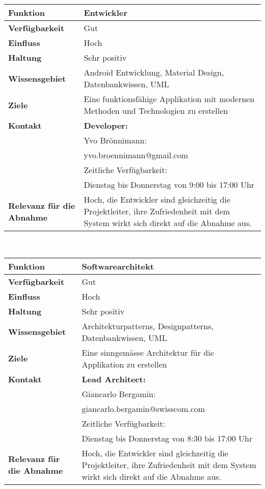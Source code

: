 \vspace{20pt}
\begin{tabular}{p{3cm}|p{9cm}}
     {\large\textbf{Funktion}} & {\large\textbf{Entwickler}}\\
     \hline
     \textbf{Verfügbarkeit} & Gut \\
     \hline
     \textbf{Einfluss} & Hoch \\
     \hline
     \textbf{Haltung}&Sehr positiv\\
     \hline
     \textbf{Wissensgebiet} & Android Entwicklung, Material Design, Datenbankwissen, UML\\
     \hline
     \textbf{Ziele} & Eine funktionsfähige Applikation mit modernen Methoden und Technologien zu erstellen\\
     \hline
     \textbf{Kontakt}&\textbf{Developer:}\\
    &Yvo Brönnimann:\\
   	&yvo.broennimann@gmail.com\\
    &Zeitliche Verfügbarkeit:\\
    &Dienstag bis Donnerstag von 9:00 bis 17:00 Uhr\\
    \hline
    \textbf{Relevanz für die Abnahme} & Hoch, die Entwickler sind gleichzeitig die Projektleiter, ihre Zufriedenheit mit dem System wirkt sich direkt auf die Abnahme aus.\\
    \hline

     
\end{tabular}
\vspace{30pt}\\


\begin{tabular}{p{3cm}|p{9cm}}
     {\large\textbf{Funktion}} & {\large\textbf{Softwarearchitekt}} \\
     \hline
     \textbf{Verfügbarkeit} & Gut \\
     \hline
     \textbf{Einfluss} & Hoch \\
     \hline
     \textbf{Haltung}&Sehr positiv\\
     \hline
     \textbf{Wissensgebiet} & Architekturpatterns, Designpatterns, Datenbankwissen,
     UML\\
     \hline
     \textbf{Ziele} & Eine sinngemässe Architektur für die Applikation zu erstellen\\
     \hline
     \textbf{Kontakt} & \textbf{Lead Architect:}\\
                &Giancarlo Bergamin:  \\
                &giancarlo.bergamin@swisscom.com\\
                &Zeitliche Verfügbarkeit: \\
                &Dienstag bis Donnerstag von 8:30 bis 17:00 Uhr\\
    \hline
    \textbf{Relevanz für die Abnahme} & Hoch, die Entwickler sind gleichzeitig die
    Projektleiter, ihre Zufriedenheit mit dem System wirkt sich direkt auf die Abnahme
    aus.\\
    \hline
    \end{tabular}
    \vspace{30pt}\\
    
